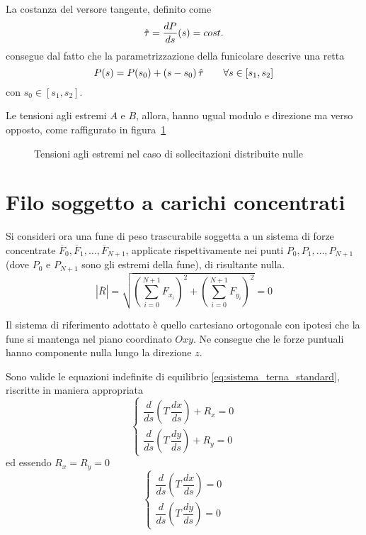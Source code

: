 La costanza del versore tangente, definito come
\[
 \hat{\tau} = \dfrac{dP}{ds}(s) = cost.
\]
consegue dal fatto che la parametrizzazione della funicolare descrive una retta
\[
 P(s) = P(s_0) + (s - s_0 )\,\hat{\tau}\qquad \forall s\in[s_1, s_2]
\]
con $s_0\in[s_1, s_2]$.

Le tensioni agli estremi $A$ e $B$, allora, hanno ugual modulo e direzione ma verso opposto, come raffigurato in figura~\ref{fig:tensioni_forza_nulla}

\begin{figure}
 \centering
 \caption{Tensioni agli estremi nel caso di sollecitazioni distribuite nulle}
 \label{fig:tensioni_forza_nulla}
\end{figure}


\section{Filo soggetto a carichi concentrati}
Si consideri ora una fune di peso trascurabile soggetta a un sistema di forze concentrate $\overline{F}_0, \overline{F}_1, \dots,  \overline{F}_{N+1}$, applicate rispettivamente nei punti $P_0, P_1, \dots, P_{N+1}$ (dove $P_0$ e $P_{N+1}$ sono gli estremi della fune), di risultante nulla. 
\[
\left|\overline{R}\right| = \sqrt{\left(\sum_{i=0}^{N+1}F_{x_i}\right)^2 +\left(\sum_{i=0}^{N+1}F_{y_i}\right)^2} = 0
\]

Il sistema di riferimento adottato è quello cartesiano ortogonale con ipotesi che la fune si mantenga nel piano coordinato $Oxy$. Ne consegue che le forze puntuali hanno componente nulla lungo la direzione $z$.

Sono valide le equazioni indefinite di equilibrio \eqref{eq:sistema_terna_standard}, riscritte in maniera appropriata
\[
\begin{cases} 
  \dfrac{d}{ds}\left(T\,\dfrac{dx}{ds}\right) + R_x = 0\\[1.5ex]
  \dfrac{d}{ds}\left(T\,\dfrac{dy}{ds}\right) + R_y = 0
\end{cases}
\]
ed essendo $R_x = R_y = 0$
\begin{equation}
\label{eq:equazione_indefinita_equilibrio_concentrati}
\begin{cases} 
  \dfrac{d}{ds}\left(T\,\dfrac{dx}{ds}\right) = 0\\[1.5ex]
  \dfrac{d}{ds}\left(T\,\dfrac{dy}{ds}\right) = 0
\end{cases}
\end{equation}

